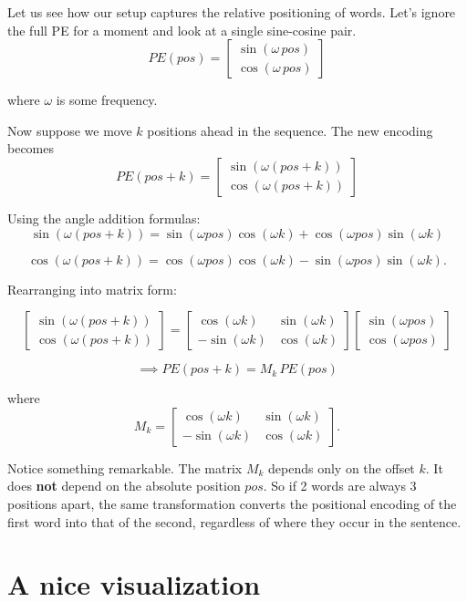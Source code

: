 Let us see how our setup captures the relative positioning of words. Let's ignore the full PE for a moment and look at a single sine-cosine pair.
\[
PE(pos)=
\begin{bmatrix}
\sin(\omega\, pos)\\
\cos(\omega\, pos)
\end{bmatrix}
\]

where \(\omega\) is some frequency.

Now suppose we move \(k\) positions ahead in the sequence. The new encoding becomes
\[
PE(pos+k)=
\begin{bmatrix}
\sin(\omega(pos+k))\\
\cos(\omega(pos+k))
\end{bmatrix}
\]

Using the angle addition formulas:
\[
\sin(\omega(pos+k))
=
\sin(\omega pos)\cos(\omega k)
+
\cos(\omega pos)\sin(\omega k)
\]

\[
\cos(\omega(pos+k))
=
\cos(\omega pos)\cos(\omega k)
-
\sin(\omega pos)\sin(\omega k).
\]

Rearranging into matrix form:

\[
\begin{bmatrix}
\sin(\omega(pos+k))\\
\cos(\omega(pos+k))
\end{bmatrix}
=
\begin{bmatrix}
\cos(\omega k) & \sin(\omega k)\\
-\sin(\omega k) & \cos(\omega k)
\end{bmatrix}
\begin{bmatrix}
\sin(\omega pos)\\
\cos(\omega pos)
\end{bmatrix}
\]

\[ \implies
PE(pos+k)
=
M_k\,PE(pos)
\]

where
\[
M_k=
\begin{bmatrix}
\cos(\omega k) & \sin(\omega k)\\
-\sin(\omega k) & \cos(\omega k)
\end{bmatrix}.
\]

Notice something remarkable. The matrix \(M_k\) depends only on the offset \(k\). It does \textbf{not} depend on the absolute position \(pos\). So if 2 words are always 3 positions apart, the same transformation converts the positional encoding of the first word into that of the second, regardless of where they occur in the sentence.

\section{A nice visualization}

